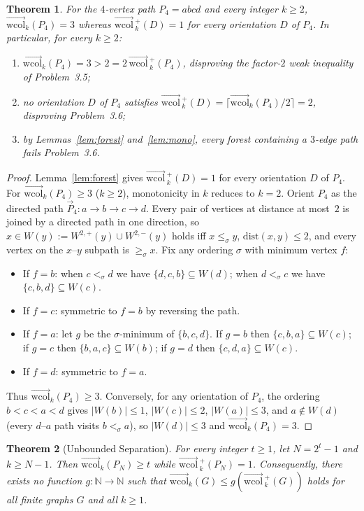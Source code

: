 \documentclass[11pt]{article}
\newtheorem{theorem}{Theorem}
\newcommand{\wcol}{\overrightarrow{\mathrm{wcol}}}
\newcommand{\wcolp}{\overrightarrow{\mathrm{wcol}}\,^{+}}
\begin{document}
\begin{theorem}\label{thm:p4}
For the $4$-vertex path $P_4 = abcd$ and every integer $k \ge 2$, $\wcol_k(P_4) = 3$ whereas $\wcolp_k(D) = 1$ for every orientation $D$ of $P_4$. In particular, for every $k \ge 2$:
\begin{enumerate}
  \item $\wcol_k(P_4) = 3 > 2 = 2\,\wcolp_k(P_4)$, disproving the factor-$2$ weak inequality of Problem~3.5;
  \item no orientation $D$ of $P_4$ satisfies $\wcolp_k(D) = \lceil \wcol_k(P_4)/2 \rceil = 2$, disproving Problem~3.6;
  \item by Lemmas~\ref{lem:forest} and~\ref{lem:mono}, every forest containing a $3$-edge path fails Problem~3.6.
\end{enumerate}
\end{theorem}

\begin{proof}
Lemma~\ref{lem:forest} gives $\wcolp_k(D) = 1$ for every orientation $D$ of $P_4$. For $\wcol_k(P_4) \ge 3$ ($k \ge 2$), monotonicity in $k$ reduces to $k = 2$. Orient $P_4$ as the directed path $\vec{P}_4 : a \to b \to c \to d$. Every pair of vertices at distance at most~$2$ is joined by a directed path in one direction, so $x \in W(y) := W^{2,+}(y) \cup W^{2,-}(y)$ holds iff $x \le_\sigma y$, $\mathrm{dist}(x, y) \le 2$, and every vertex on the $x$--$y$ subpath is $\ge_\sigma x$. Fix any ordering $\sigma$ with minimum vertex $f$:
\begin{itemize}
  \item If $f = b$: when $c <_\sigma d$ we have $\{d, c, b\} \subseteq W(d)$; when $d <_\sigma c$ we have $\{c, b, d\} \subseteq W(c)$.
  \item If $f = c$: symmetric to $f = b$ by reversing the path.
  \item If $f = a$: let $g$ be the $\sigma$-minimum of $\{b, c, d\}$. If $g = b$ then $\{c, b, a\} \subseteq W(c)$; if $g = c$ then $\{b, a, c\} \subseteq W(b)$; if $g = d$ then $\{c, d, a\} \subseteq W(c)$.
  \item If $f = d$: symmetric to $f = a$.
\end{itemize}
Thus $\wcol_k(P_4) \ge 3$. Conversely, for any orientation of $P_4$, the ordering $b < c < a < d$ gives $|W(b)| \le 1$, $|W(c)| \le 2$, $|W(a)| \le 3$, and $a \notin W(d)$ (every $d$--$a$ path visits $b <_\sigma a$), so $|W(d)| \le 3$ and $\wcol_k(P_4) = 3$.
\end{proof}

\begin{theorem}[Unbounded Separation]\label{thm:unbounded}
For every integer $t \ge 1$, let $N = 2^t - 1$ and $k \ge N - 1$. Then $\wcol_k(P_N) \ge t$ while $\wcolp_k(P_N) = 1$. Consequently, there exists no function $g : \mathbb{N} \to \mathbb{N}$ such that $\wcol_k(G) \le g(\wcolp_k(G))$ holds for all finite graphs $G$ and all $k \ge 1$.
\end{theorem}
\end{document}
